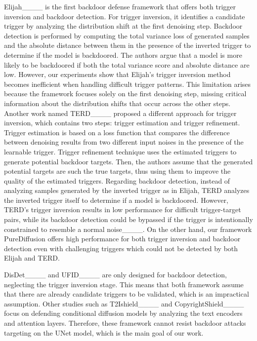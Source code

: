 Elijah____ is the first backdoor defense framework that offers both trigger inversion and backdoor detection. For trigger inversion, it identifies a candidate trigger by analyzing the distribution shift at the first denoising step. Backdoor detection is performed by computing the total variance loss of generated samples and the absolute distance between them in the presence of the inverted trigger to determine if the model is backdoored. The authors argue that a model is more likely to be backdoored if both the total variance score and absolute distance are low.
However, our experiments show that Elijah's trigger inversion method becomes inefficient when handling difficult trigger patterns. This limitation arises because the framework focuses solely on the first denoising step, missing critical information about the distribution shifts that occur across the other steps.
Another work named TERD____ proposed a different approach for trigger inversion, which contains two steps: trigger estimation and trigger refinement. Trigger estimation is based on a loss function that compares the difference between denoising results from two different input noises in the presence of the learnable trigger. Trigger refinement technique uses the estimated triggers to generate potential backdoor targets. Then, the authors assume that the generated potential targets are such the true targets, thus using them to improve the quality of the estimated triggers. Regarding backdoor detection, instead of analyzing samples generated by the inverted trigger as in Elijah, TERD analyzes the inverted trigger itself to determine if a model is backdoored. However, TERD's trigger inversion results in low performance for difficult trigger-target pairs, while its backdoor detection could be bypassed if the trigger is intentionally constrained to resemble a normal noise____. On the other hand, our framework PureDiffusion offers high performance for both trigger inversion and backdoor detection even with challenging triggers which could not be detected by both Elijah and TERD. 

DisDet____ and UFID____ are only designed for backdoor detection, neglecting the trigger inversion stage. This means that both framework assume that there are already candidate triggers to be validated, which is an impractical assumption. Other studies such as T2Ishield____ and CopyrightShield____ focus on defending conditional diffusion models by analyzing the text encoders and attention layers. Therefore, these framework cannot resist backdoor attacks targeting on the UNet model, which is the main goal of our work.

